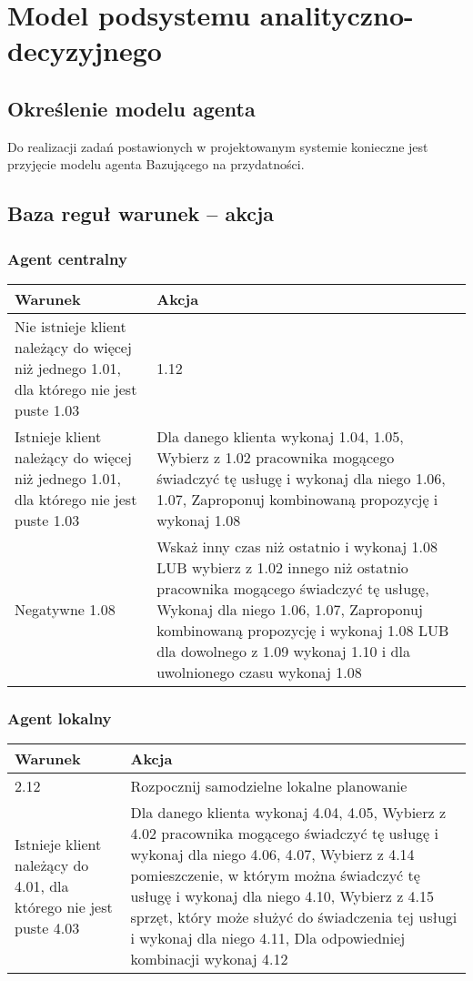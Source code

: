 \section{Model podsystemu analityczno-decyzyjnego}
\subsection{Określenie modelu agenta}
Do realizacji zadań postawionych w projektowanym systemie konieczne jest przyjęcie modelu agenta Bazującego na przydatności.

\subsection{Baza reguł warunek – akcja}

\subsubsection{Agent centralny}

\begin{tabular}{p{7cm}|p{7cm}}
Warunek & Akcja\\
\hline
Nie istnieje klient należący do więcej niż jednego 1.01, dla którego nie jest puste 1.03 & 1.12\\

Istnieje klient należący do więcej niż jednego 1.01, dla którego nie jest puste 1.03 &
Dla danego klienta wykonaj 1.04, 1.05,
Wybierz z 1.02 pracownika mogącego świadczyć tę usługę i wykonaj dla niego 1.06, 1.07,
Zaproponuj kombinowaną propozycję i wykonaj 1.08 \\

Negatywne 1.08 &
Wskaż inny czas niż ostatnio i wykonaj 1.08
LUB wybierz z 1.02 innego niż ostatnio pracownika mogącego świadczyć tę usługę,
Wykonaj dla niego 1.06, 1.07,
Zaproponuj kombinowaną propozycję i wykonaj 1.08
LUB dla dowolnego z 1.09 wykonaj 1.10 i dla uwolnionego czasu wykonaj 1.08\\



\end{tabular}

\subsubsection{Agent lokalny}

\begin{tabular}{p{7cm}|p{7cm}}
Warunek & Akcja\\
\hline
2.12 & Rozpocznij samodzielne lokalne planowanie\\

Istnieje klient należący do 4.01, dla którego nie jest puste 4.03 &
Dla danego klienta wykonaj 4.04, 4.05,
Wybierz z 4.02 pracownika mogącego świadczyć tę usługę i wykonaj dla niego 4.06, 4.07,
Wybierz z 4.14 pomieszczenie, w którym można świadczyć tę usługę i wykonaj dla niego 4.10,
Wybierz z 4.15 sprzęt, który może służyć do świadczenia tej usługi i wykonaj dla niego 4.11,
Dla odpowiedniej kombinacji wykonaj 4.12\\


\end{tabular}

